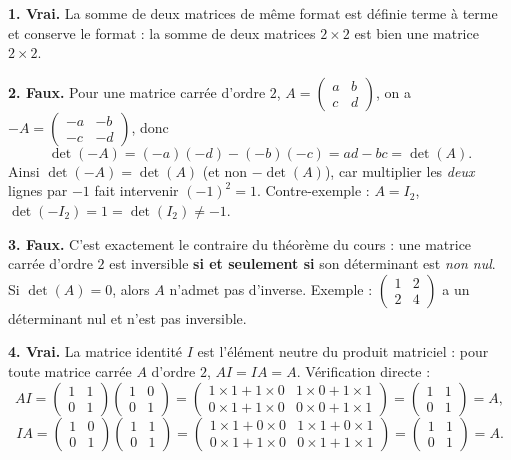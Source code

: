 \documentclass[11pt]{article}
\begin{document}
\begin{corrige}
\textbf{1. Vrai.} La somme de deux matrices de même format est définie terme à terme et conserve le format : la somme de deux matrices $2\times 2$ est bien une matrice $2\times 2$.

\textbf{2. Faux.} Pour une matrice carrée d'ordre $2$, $A = \begin{pmatrix} a & b \\ c & d \end{pmatrix}$, on a $-A = \begin{pmatrix} -a & -b \\ -c & -d \end{pmatrix}$, donc
\[ \det(-A) = (-a)(-d) - (-b)(-c) = ad - bc = \det(A). \]
Ainsi $\det(-A) = \det(A)$ (et non $-\det(A)$), car multiplier les \emph{deux} lignes par $-1$ fait intervenir $(-1)^2 = 1$. Contre-exemple : $A = I_2$, $\det(-I_2) = 1 = \det(I_2) \neq -1$.

\textbf{3. Faux.} C'est exactement le contraire du théorème du cours : une matrice carrée d'ordre $2$ est inversible \textbf{si et seulement si} son déterminant est \emph{non nul}. Si $\det(A) = 0$, alors $A$ n'admet pas d'inverse. Exemple : $\begin{pmatrix} 1 & 2 \\ 2 & 4 \end{pmatrix}$ a un déterminant nul et n'est pas inversible.

\textbf{4. Vrai.} La matrice identité $I$ est l'élément neutre du produit matriciel : pour toute matrice carrée $A$ d'ordre $2$, $AI = IA = A$. Vérification directe :
\[ AI = \begin{pmatrix} 1 & 1 \\ 0 & 1 \end{pmatrix}\begin{pmatrix} 1 & 0 \\ 0 & 1 \end{pmatrix} = \begin{pmatrix} 1\times 1 + 1\times 0 & 1\times 0 + 1\times 1 \\ 0\times 1 + 1\times 0 & 0\times 0 + 1\times 1 \end{pmatrix} = \begin{pmatrix} 1 & 1 \\ 0 & 1 \end{pmatrix} = A, \]
\[ IA = \begin{pmatrix} 1 & 0 \\ 0 & 1 \end{pmatrix}\begin{pmatrix} 1 & 1 \\ 0 & 1 \end{pmatrix} = \begin{pmatrix} 1\times 1 + 0\times 0 & 1\times 1 + 0\times 1 \\ 0\times 1 + 1\times 0 & 0\times 1 + 1\times 1 \end{pmatrix} = \begin{pmatrix} 1 & 1 \\ 0 & 1 \end{pmatrix} = A. \]
\end{corrige}
\end{document}
